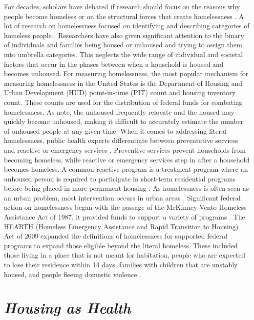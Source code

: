 For decades, scholars have debated if research should focus on the reasons why people become homeless or on the structural forces that create homelessness \citep{shlay_social_2003}. A lot of research on homelessness focused on identifying and describing categories of homeless people \citep{lee_homelessness_2021}. Researchers have also given significant attention to the binary of individuals and families being housed or unhoused and trying to assign them into umbrella categories. This neglects the wide range of individual and societal factors that occur in the phases between when a household is housed and becomes unhoused. For measuring homelessness, the most popular mechanism for measuring homelessness in the United States is the Department of Housing and Urban Development (HUD) point-in-time (PIT) count and housing inventory count. These counts are used for the distribution of federal funds for combating homelessness. As \citet{agans_enumerating_2014}  note, the unhoused frequently relocate and the housed may quickly become unhoused, making it difficult to accurately estimate the number of unhoused people at any given time. When it comes to addressing literal homelessness, public health experts differentiate between preventative services and reactive or emergency services \citep{oregan_how_2021}. Preventive services prevent households from becoming homeless, while reactive or emergency services step in after a household becomes homeless. A common reactive program is a treatment program where an unhoused person is required to participate in short-term residential programs before being placed in more permanent housing \citep{evans_reducing_2019}. As homelessness is often seen as an urban problem, most intervention occurs in urban areas \citep{gleason_using_2021}. Significant federal action on homelessness began with the passage of the McKinney-Vento Homeless Assistance Act of 1987. it provided funds to support a variety of programs  \citep{evans_reducing_2019}. The HEARTH (Homeless Emergency Assistance and Rapid Transition to Housing) Act of 2009 expanded the definitions of homelessness for supported federal programs to expand those eligible beyond the literal homeless. These included those living in a place that is not meant for habitation, people who are expected to lose their residence within 14 days, families with children that are unstably housed, and people fleeing domestic violence  \citep{evans_reducing_2019}. %


\section{\textit{Housing as Health}}


